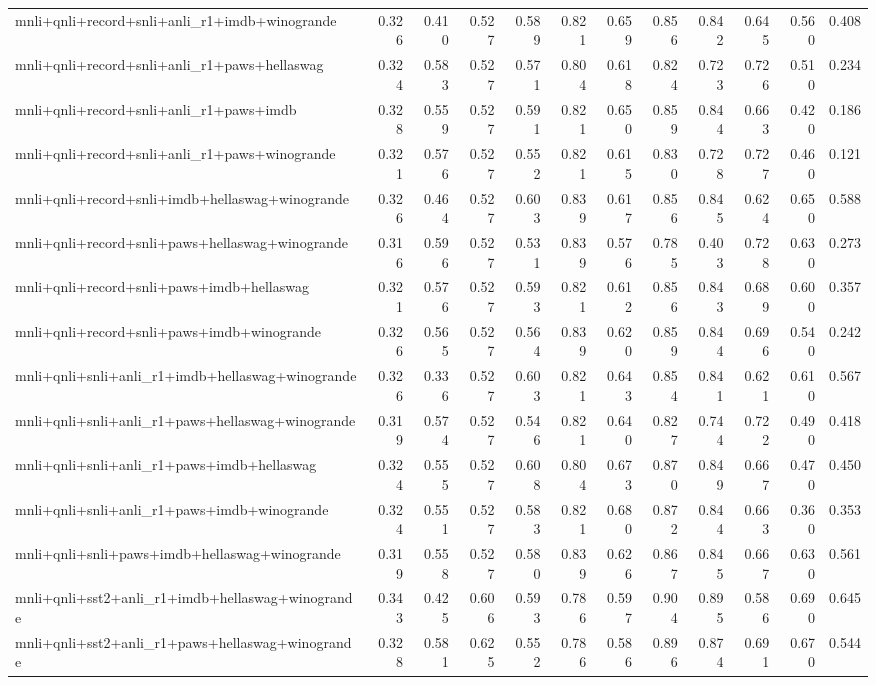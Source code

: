 \begin{table}[t]
\begin{tabular}{lrrrrrrrrrrr}
    mnli+qnli+record+snli+anli\_r1+imdb+winogrande & 0.326 & 0.410 & 0.527 & 0.589 & 0.821 & 0.659 & 0.856 & 0.842 & 0.645 & 0.560 & 0.408 \\
    mnli+qnli+record+snli+anli\_r1+paws+hellaswag & 0.324 & 0.583 & 0.527 & 0.571 & 0.804 & 0.618 & 0.824 & 0.723 & 0.726 & 0.510 & 0.234 \\
    mnli+qnli+record+snli+anli\_r1+paws+imdb & 0.328 & 0.559 & 0.527 & 0.591 & 0.821 & 0.650 & 0.859 & 0.844 & 0.663 & 0.420 & 0.186 \\
    mnli+qnli+record+snli+anli\_r1+paws+winogrande & 0.321 & 0.576 & 0.527 & 0.552 & 0.821 & 0.615 & 0.830 & 0.728 & 0.727 & 0.460 & 0.121 \\
    mnli+qnli+record+snli+imdb+hellaswag+winogrande & 0.326 & 0.464 & 0.527 & 0.603 & 0.839 & 0.617 & 0.856 & 0.845 & 0.624 & 0.650 & 0.588 \\
    mnli+qnli+record+snli+paws+hellaswag+winogrande & 0.316 & 0.596 & 0.527 & 0.531 & 0.839 & 0.576 & 0.785 & 0.403 & 0.728 & 0.630 & 0.273 \\
    mnli+qnli+record+snli+paws+imdb+hellaswag & 0.321 & 0.576 & 0.527 & 0.593 & 0.821 & 0.612 & 0.856 & 0.843 & 0.689 & 0.600 & 0.357 \\
    mnli+qnli+record+snli+paws+imdb+winogrande & 0.326 & 0.565 & 0.527 & 0.564 & 0.839 & 0.620 & 0.859 & 0.844 & 0.696 & 0.540 & 0.242 \\
    mnli+qnli+snli+anli\_r1+imdb+hellaswag+winogrande & 0.326 & 0.336 & 0.527 & 0.603 & 0.821 & 0.643 & 0.854 & 0.841 & 0.621 & 0.610 & 0.567 \\
    mnli+qnli+snli+anli\_r1+paws+hellaswag+winogrande & 0.319 & 0.574 & 0.527 & 0.546 & 0.821 & 0.640 & 0.827 & 0.744 & 0.722 & 0.490 & 0.418 \\
    mnli+qnli+snli+anli\_r1+paws+imdb+hellaswag & 0.324 & 0.555 & 0.527 & 0.608 & 0.804 & 0.673 & 0.870 & 0.849 & 0.667 & 0.470 & 0.450 \\
    mnli+qnli+snli+anli\_r1+paws+imdb+winogrande & 0.324 & 0.551 & 0.527 & 0.583 & 0.821 & 0.680 & 0.872 & 0.844 & 0.663 & 0.360 & 0.353 \\
    mnli+qnli+snli+paws+imdb+hellaswag+winogrande & 0.319 & 0.558 & 0.527 & 0.580 & 0.839 & 0.626 & 0.867 & 0.845 & 0.667 & 0.630 & 0.561 \\
    mnli+qnli+sst2+anli\_r1+imdb+hellaswag+winogrande & 0.343 & 0.425 & 0.606 & 0.593 & 0.786 & 0.597 & 0.904 & 0.895 & 0.586 & 0.690 & 0.645 \\
    mnli+qnli+sst2+anli\_r1+paws+hellaswag+winogrande & 0.328 & 0.581 & 0.625 & 0.552 & 0.786 & 0.586 & 0.896 & 0.874 & 0.691 & 0.670 & 0.544 \\

\end{tabular}
\end{table}
